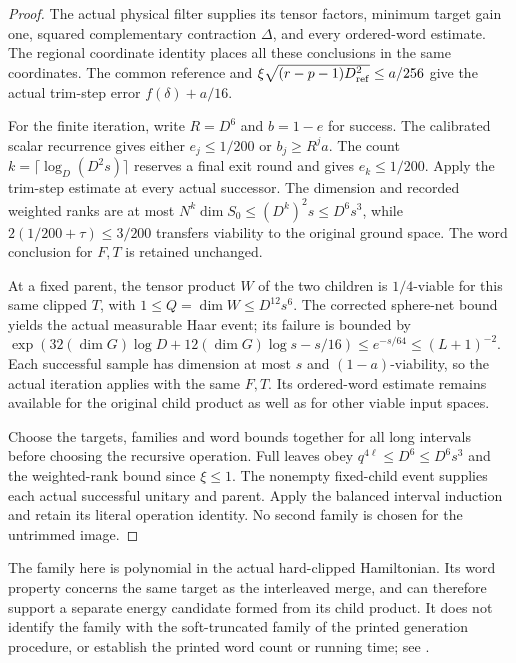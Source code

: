 \begin{proof}\leanok
    The actual physical filter supplies its tensor factors, minimum
    target gain one, squared complementary contraction $\Delta$, and
    every ordered-word estimate. The regional coordinate identity
    places all these conclusions in the same coordinates. The common
    reference and $\xi\sqrt{(r-p-1)D_{\rm ref}^2}\le a/256$ give the
    actual trim-step error $f(\delta)+a/16$.

    For the finite iteration, write $R=D^6$ and $b=1-e$ for success.
    The calibrated scalar recurrence gives either $e_j\le1/200$ or
    $b_j\ge R^ja$. The count
    $k=\lceil\log_D(D^2s)\rceil$ reserves a final exit round and
    gives $e_k\le1/200$. Apply the trim-step estimate at every actual
    successor. The dimension and recorded weighted ranks are at most
    $N^k\dim S_0\le(D^k)^2s\le D^6s^3$, while
    $2(1/200+\tau)\le3/200$ transfers viability to the original ground
    space. The word conclusion for $F,T$ is retained unchanged.

    At a fixed parent, the tensor product $W$ of the two children is
    $1/4$-viable for this same clipped $T$, with
    $1\le Q=\dim W\le D^{12}s^6$. The corrected sphere-net bound
    yields the actual measurable Haar event; its failure is bounded by
    $\exp(32(\dim G)\log D+12(\dim G)\log s-s/16)\le e^{-s/64}\le(L+1)^{-2}$.
    Each successful sample has dimension at most $s$ and
    $(1-a)$-viability, so the actual iteration applies with the same
    $F,T$. Its ordered-word estimate remains available for the original
    child product as well as for other viable input spaces.

    Choose the targets, families and word bounds together for all long
    intervals before choosing the recursive operation. Full leaves obey
    $q^{4\ell}\le D^6\le D^6s^3$ and the weighted-rank bound since
    $\xi\le1$. The nonempty fixed-child event supplies each actual
    successful unitary and parent. Apply the balanced interval induction
    and retain its literal operation identity. No second family is
    chosen for the untrimmed image.
\end{proof}

The family here is polynomial in the actual hard-clipped Hamiltonian.
Its word property concerns the same target as the interleaved merge, and
can therefore support a separate energy candidate formed from its child
product. It does not identify the family with the soft-truncated family
of the printed generation procedure, or establish the printed word count
or running time; see \cite{gap:alvv16_approximation_parameters}.

